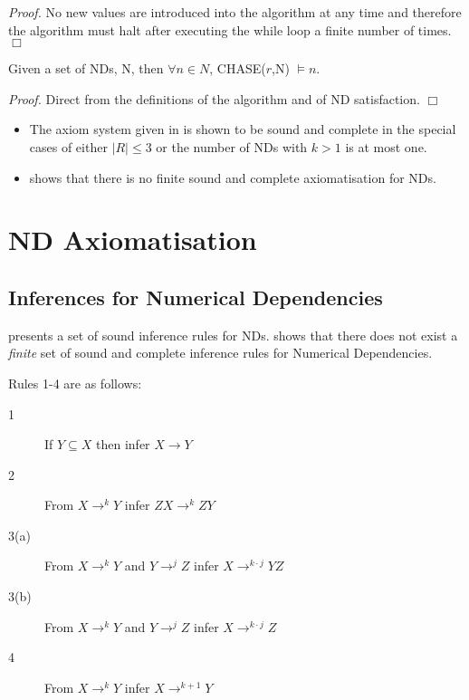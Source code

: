 {\em Proof.} No new values are introduced into the algorithm at any
time and therefore the algorithm must halt after executing the while
loop a finite number of times. $\Box$

\begin{theorem}\label{th:chase}
\begin{rm}
Given a set of NDs, N, then $\forall n \in N$, CHASE($r$,N) $\models n$.
\end{rm}
\end{theorem}

{\em Proof.} Direct from the definitions of the algorithm and of ND
satisfaction. $\Box$


\begin{itemize}
\item The axiom system given in \cite{gm85a} is shown to be sound and
complete in the special cases of either $|R| \le 3$ or the number of
NDs with $k > 1$ is at most one.
\item \cite{gm85b} shows that there is no finite sound and complete
axiomatisation for NDs. 
\end{itemize}






\section{ND Axiomatisation}


\subsection{Inferences for Numerical Dependencies}

\cite{gm85a} presents a set of sound inference rules for NDs. \cite{gm85b}
shows that there does not exist a {\em finite} set of sound and
complete inference rules for Numerical Dependencies.

\medskip
Rules 1-4 are as follows:
\begin{description}
\item[1] If $Y \subseteq X$ then infer $X \to Y$
\item[2] From $X \to^k Y$ infer $ZX \to^k ZY$
\item[3(a)] From $X \to^k Y$ and $Y \to^j Z$ infer $X \to^{k \cdot j} YZ$
\item[3(b)] From $X \to^k Y$ and $Y \to^j Z$ infer $X \to^{k \cdot j} Z$
\item[4] From $X \to^k Y$ infer $X \to^{k + 1} Y$
\end{description}

